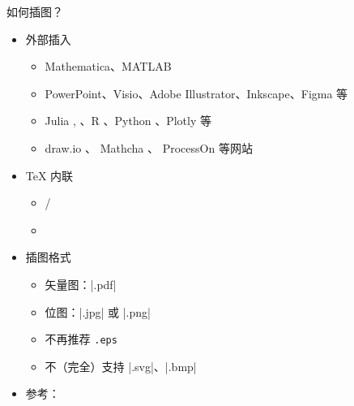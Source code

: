 \begin{frame}[fragile]{如何插图？}
\begin{itemize}
  \item<+-> 外部插入
    \begin{itemize}
      \item Mathematica、MATLAB
      \item PowerPoint、Visio、Adobe Illustrator、Inkscape、Figma 等
      \item Julia , 、R 、Python 、Plotly 等
      \item draw.io 、
            Mathcha 、
            ProcessOn  等网站
    \end{itemize}

  \item<+-> \TeX{} 内联
    \begin{itemize}
      \item {}/\TikZ
      \item {}
    \end{itemize}

  \item<+-> 插图格式
    \begin{itemize}
      \item 矢量图：|.pdf|
      \item 位图：|.jpg| 或 |.png|
      \item \alert{不再推荐 \texttt{.eps}}
      \item 不（完全）支持 |.svg|、|.bmp|
    \end{itemize}

  \item<+-> 参考：
\end{itemize}
\end{frame}

